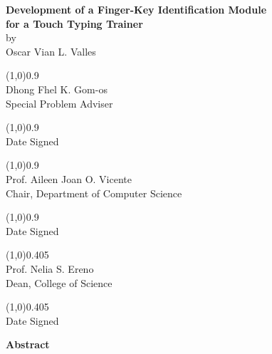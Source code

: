 \documentclass{report}
\begin{document}
\begin{center}
	\textbf{Development of a Finger-Key Identification Module\\for a Touch Typing Trainer}\\
	by\\
	Oscar Vian L. Valles

	\par\vspace{0.5cm}

	\begin{minipage}[t]{0.45\textwidth}
		\centering
		\line(1,0){0.9\textwidth}\\
		Dhong Fhel K. Gom-os\\
		Special Problem Adviser

		\par\vspace{0.5cm}
		\line(1,0){0.9\textwidth}\\
		Date Signed
	\end{minipage}
	\begin{minipage}[t]{0.45\textwidth}
		\centering
		\line(1,0){0.9\textwidth}\\
		Prof. Aileen Joan O. Vicente\\
		Chair, Department of Computer Science

		\par\vspace{0.5cm}
		\line(1,0){0.9\textwidth}\\
		Date Signed
	\end{minipage}

	\par\vspace{2cm}

	\line(1,0){0.405\textwidth}\\
	Prof. Nelia S. Ereno\\
	Dean, College of Science

	\par\vspace{0.5cm}
	\line(1,0){0.405\textwidth}\\
	Date Signed

	\par\vspace{2cm}
\end{center}

\newpage

\begin{center}
	\LARGE\textbf{Abstract}
\end{center}
\end{document}
